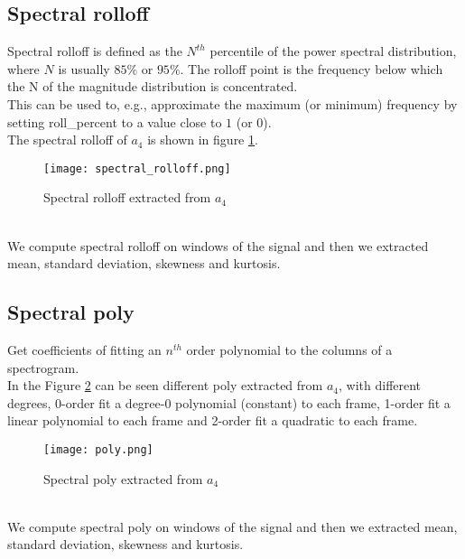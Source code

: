 \subsection{Spectral rolloff}
Spectral rolloff is defined as the $N^{th}$ percentile of the power spectral distribution, where $N$ is usually $85 \%$ or $95 \%$. The rolloff point is the frequency below which the N of the magnitude distribution is concentrated.
\\
This can be used to, e.g., approximate the maximum (or minimum) frequency by setting roll\_percent to a value close to $1$ (or $0$).
\\
The spectral rolloff of $a_4$ is shown in figure \ref{fig:spectral_rolloff}.
\begin{figure}[h]
    \centering
    \texttt{[image: spectral\_rolloff.png]} 
	\caption{Spectral rolloff extracted from $a_4$}
    \label{fig:spectral_rolloff}
\end{figure}
\\
We compute spectral rolloff on windows of the signal and then we extracted mean, standard deviation, skewness and kurtosis.

\subsection{Spectral poly}
Get coefficients of fitting an $n^{th}$ order polynomial to the columns of a spectrogram.
\\
In the Figure \ref{fig:poly} can be seen different poly extracted from $a_4$, with different degrees, 0-order fit a degree-0 polynomial (constant) to each frame, 1-order fit a linear polynomial to each frame and 2-order fit a quadratic to each frame.
\begin{figure}[h]
    \centering
    \texttt{[image: poly.png]} 
	\caption{Spectral poly extracted from $a_4$}
    \label{fig:poly}
\end{figure}
\\
We compute spectral poly on windows of the signal and then we extracted mean, standard deviation, skewness and kurtosis.

